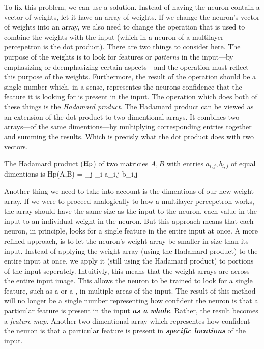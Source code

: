 To fix this problem, we can use a  solution.
Instead of having the neuron contain a vector of weights, let it have an array of weights.
If we change the neuron's vector of weights into an array, we also need to change the operation that is used to combine the weights with the input (which in a neuron of a multilayer percepetron is the dot product).
There are two things to consider here.
The purpose of the weights is to look for features or {\em patterns} in the input---by emphasizing or deemphasizing certain aspects---and the operation must reflect this purpose of the weights.
Furthermore, the result of the operation should be a single number which, in a sense, representes the neurons  confidence that the feature it is looking for is present in the input.
The operation which does both of these things is the {\em Hadamard product}.
The Hadamard product can be viewed as an extension of the dot product to two dimentional arrays.
It combines two arrays---of the same dimentions---by multiplying corresponding entries together and summing the results.
Which is precisly what the dot product does with two vectors.

The Hadamard product (${\rm Hp}$) of two matricies $A,B$ with entries $a_{i,j},b_{i,j}$ of equal dimentions is
\startplaceformula
\startformula
{\rm Hp}(A,B) = \sum_{j} \sum_{i} a_{i,j} \cdot b_{i,j}
\stopformula
\stopplaceformula

\indentation
Another thing we need to take into account is the dimentions of our new weight array.
If we were to proceed analogically to how a multilayer percepetron works, the array should have the same size as the input to the neuron.
 each value in the input to an individual weight in the neuron.
But this approach means that each neuron, in principle, looks for a single feature in the entire input at once.
A more refined approach, is to let the neuron's weight array be smaller in size than its input.
Instead of applying the weight array (using the Hadamard product) to the entire input at once, we apply it (still using the Hadamard product) to portions of the input seperately.
Intuitivly, this means that the weight arrays are  across the entire input image.
This allows the neuron to be trained to look for a single feature, such as a  or a , in multiple areas of the input.
The result of this method will no longer be a single number representing how  confident the neuron is that a particular feature is present in the input {\em\bf as a whole}.
Rather, the result becomes a {\em feature map}.
Another two dimentional array which representes how  confident the neuron is that a particular feature is present in {\em\bf specific locations} of the input.

